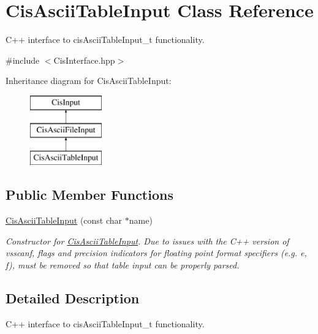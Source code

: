 \hypertarget{classCisAsciiTableInput}{}\section{Cis\+Ascii\+Table\+Input Class Reference}
\label{classCisAsciiTableInput}


C++ interface to cis\+Ascii\+Table\+Input\+\_\+t functionality.  




{\ttfamily \#include $<$Cis\+Interface.\+hpp$>$}

Inheritance diagram for Cis\+Ascii\+Table\+Input\+:\begin{figure}[H]
\begin{center}
\leavevmode
\includegraphics[height=3.000000cm]{classCisAsciiTableInput}
\end{center}
\end{figure}
\subsection*{Public Member Functions}
\begin{DoxyCompactItemize}
\item 
\mbox{\hyperlink{classCisAsciiTableInput_ae87bf636c04e42a7ab745eb164c52b41}{Cis\+Ascii\+Table\+Input}} (const char $\ast$name)
\begin{DoxyCompactList}\small\item\em Constructor for \mbox{\hyperlink{classCisAsciiTableInput}{Cis\+Ascii\+Table\+Input}}. Due to issues with the C++ version of vsscanf, flags and precision indicators for floating point format specifiers (e.\+g. e, f), must be removed so that table input can be properly parsed. \end{DoxyCompactList}\end{DoxyCompactItemize}


\subsection{Detailed Description}
C++ interface to cis\+Ascii\+Table\+Input\+\_\+t functionality. 

